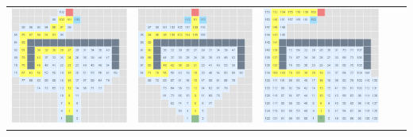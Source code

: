 \documentclass{article}
\begin{document}
\begin{center}
\begin{tabular}{c c c c c}
\includegraphics[scale=0.15]{images/scr17.png} &
\includegraphics[scale=0.15]{images/scr18.png} &
\includegraphics[scale=0.15]{images/scr19.png} \\

\end{tabular}
\end{center}
\end{document}
